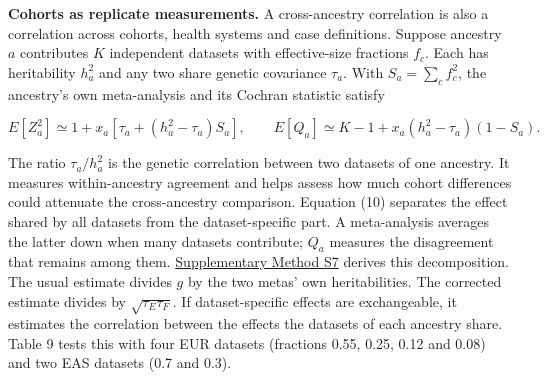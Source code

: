 \documentclass[11pt,a4paper]{article}
\begin{document}
\textbf{Cohorts as replicate measurements.} A cross-ancestry correlation is also a correlation across cohorts, health systems and case definitions. Suppose ancestry \(a\) contributes \(K\) independent datasets with effective-size fractions \(f_c\). Each has heritability \(h_a^2\) and any two share genetic covariance \(\tau_a\). With \(S_a=\sum_cf_c^2\), the ancestry's own meta-analysis and its Cochran statistic satisfy

\[
E[Z_a^2]\simeq 1+x_a\left[\tau_a+(h_a^2-\tau_a)S_a\right],\qquad
E[Q_a]\simeq K-1+x_a(h_a^2-\tau_a)(1-S_a). \tag{10}
\]

The ratio \(\tau_a/h_a^2\) is the genetic correlation between two datasets of one ancestry. It measures within-ancestry agreement and helps assess how much cohort differences could attenuate the cross-ancestry comparison. Equation (10) separates the effect shared by all datasets from the dataset-specific part. A meta-analysis averages the latter down when many datasets contribute; \(Q_a\) measures the disagreement that remains among them. \hyperref[s7-within-ancestry-heterogeneity]{Supplementary Method S7} derives this decomposition. The usual estimate divides \(g\) by the two metas' own heritabilities. The corrected estimate divides by \(\sqrt{\tau_E\tau_F}\). If dataset-specific effects are exchangeable, it estimates the correlation between the effects the datasets of each ancestry share. Table 9 tests this with four EUR datasets (fractions 0.55, 0.25, 0.12 and 0.08) and two EAS datasets (0.7 and 0.3).
\end{document}
